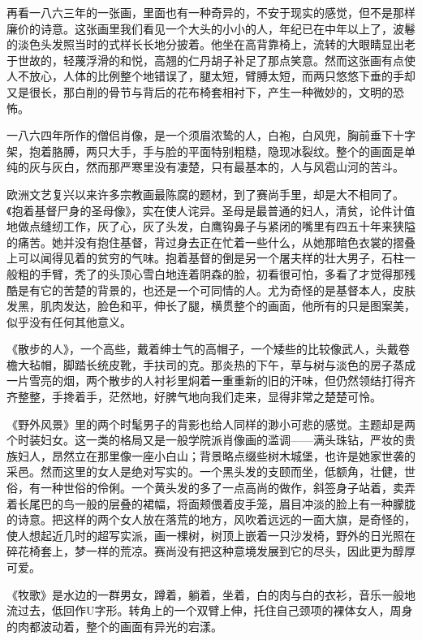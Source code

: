 \par 再看一八六三年的一张画，里面也有一种奇异的，不安于现实的感觉，但不是那样廉价的诗意。这张画里我们看见一个大头的小小的人，年纪已在中年以上了，波鬈的淡色头发照当时的式样长长地分披着。他坐在高背靠椅上，流转的大眼睛显出老于世故的，轻蔑浮滑的和悦，高翘的仁丹胡子补足了那点笑意。然而这张画有点使人不放心，人体的比例整个地错误了，腿太短，臂膊太短，而两只悠悠下垂的手却又是很长，那白削的骨节与背后的花布椅套相衬下，产生一种微妙的，文明的恐怖。
\par 一八六四年所作的僧侣肖像，是一个须眉浓鸷的人，白袍，白风兜，胸前垂下十字架，抱着胳膊，两只大手，手与脸的平面特别粗糙，隐现冰裂纹。整个的画面是单纯的灰与灰白，然而那严寒里没有凄楚，只有最基本的，人与风雹山河的苦斗。
\par 欧洲文艺复兴以来许多宗教画最陈腐的题材，到了赛尚手里，却是大不相同了。《抱着基督尸身的圣母像》，实在使人诧异。圣母是最普通的妇人，清贫，论件计值地做点缝纫工作，灰了心，灰了头发，白鹰钩鼻子与紧闭的嘴里有四五十年来狭隘的痛苦。她并没有抱住基督，背过身去正在忙着一些什么，从她那暗色衣裳的摺叠上可以闻得见着的贫穷的气味。抱着基督的倒是另一个屠夫样的壮大男子，石柱一般粗的手臂，秃了的头顶心雪白地连着阴森的脸，初看很可怕，多看了才觉得那残酷是有它的苦楚的背景的，也还是一个可同情的人。尤为奇怪的是基督本人，皮肤发黑，肌肉发达，脸色和平，伸长了腿，横贯整个的画面，他所有的只是图案美，似乎没有任何其他意义。
\par 《散步的人》，一个高些，戴着绅士气的高帽子，一个矮些的比较像武人，头戴卷檐大毡帽，脚踏长统皮靴，手扶司的克。那炎热的下午，草与树与淡色的房子蒸成一片雪亮的烟，两个散步的人衬衫里焖着一重重新的旧的汗味，但仍然领结打得齐齐整整，手搀着手，茫然地，好脾气地向我们走来，显得非常之楚楚可怜。
\par 《野外风景》里的两个时髦男子的背影也给人同样的渺小可悲的感觉。主题却是两个时装妇女。这一类的格局又是一般学院派肖像画的滥调——满头珠钻，严妆的贵族妇人，昂然立在那里像一座小白山；背景略点缀些树木城堡，也许是她家世袭的采邑。然而这里的女人是绝对写实的。一个黑头发的支颐而坐，低额角，壮健，世俗，有一种世俗的伶俐。一个黄头发的多了一点高尚的做作，斜签身子站着，卖弄着长尾巴的鸟一般的层叠的裙幅，将面颊偎着皮手笼，眉目冲淡的脸上有一种朦胧的诗意。把这样的两个女人放在落荒的地方，风吹着远远的一面大旗，是奇怪的，使人想起近几时的超写实派，画一棵树，树顶上嵌着一只沙发椅，野外的日光照在碎花椅套上，梦一样的荒凉。赛尚没有把这种意境发展到它的尽头，因此更为醇厚可爱。
\par 《牧歌》是水边的一群男女，蹲着，躺着，坐着，白的肉与白的衣衫，音乐一般地流过去，低回作U字形。转角上的一个双臂上伸，托住自己颈项的裸体女人，周身的肉都波动着，整个的画面有异光的宕漾。
